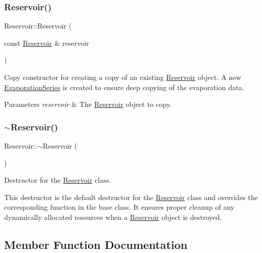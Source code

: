 \subsubsection{\texorpdfstring{Reservoir()}{Reservoir()}\hspace{0.1cm}{\footnotesize\ttfamily [9/9]}}
{\footnotesize\ttfamily Reservoir\+::\+Reservoir (\begin{DoxyParamCaption}\item[{const \mbox{\hyperlink{classReservoir}{Reservoir}} \&}]{reservoir }\end{DoxyParamCaption})}



Copy constructor for creating a copy of an existing \mbox{\hyperlink{classReservoir}{Reservoir}} object. A new {\ttfamily \mbox{\hyperlink{classEvaporationSeries}{Evaporation\+Series}}} is created to ensure deep copying of the evaporation data. 


\begin{DoxyParams}{Parameters}
{\em reservoir} & The {\ttfamily \mbox{\hyperlink{classReservoir}{Reservoir}}} object to copy. \\
\hline
\end{DoxyParams}
\mbox{\label{classReservoir_a2f8bfdc73c7470185775a940fb3531de}} 
\subsubsection{\texorpdfstring{$\sim$\+Reservoir()}{~Reservoir()}}
{\footnotesize\ttfamily Reservoir\+::$\sim$\+Reservoir (\begin{DoxyParamCaption}{ }\end{DoxyParamCaption})\hspace{0.3cm}{\ttfamily [override]}}



Destructor for the \mbox{\hyperlink{classReservoir}{Reservoir}} class. 

This destructor is the default destructor for the {\ttfamily \mbox{\hyperlink{classReservoir}{Reservoir}}} class and overrides the corresponding function in the base class. It ensures proper cleanup of any dynamically allocated resources when a {\ttfamily \mbox{\hyperlink{classReservoir}{Reservoir}}} object is destroyed. 

\subsection{Member Function Documentation}
\mbox{\label{classReservoir_a66929c055193785bc9d47bcdf0bc7445}} 
